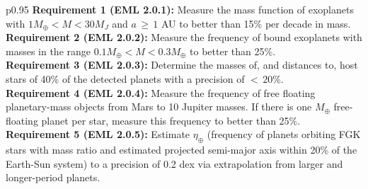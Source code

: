 \documentclass[twocolumn]{aastex631}
\begin{document}
\begin{deluxetable*}{p{0.95\linewidth}}
\tablehead{}
\startdata
\textbf{Requirement 1 (EML 2.0.1):} Measure the mass function of exoplanets with $1M_{\oplus} < M < 30 M_J$ and $a\, {\geq}\, 1$ AU to better than 15\% per decade in mass. \\[4pt]
\textbf{Requirement 2 (EML 2.0.2):} Measure the frequency of bound exoplanets with masses in the range $0.1 M_{\oplus} < M < 0.3 M_{\oplus}$ to better than 25\%. \\[4pt]
\textbf{Requirement 3 (EML 2.0.3):} Determine the masses of, and distances to, host stars of 40\% of the detected planets with a precision of $<\,20$\%. \\[4pt]
\textbf{Requirement 4 (EML 2.0.4):} Measure the frequency of free floating planetary-mass objects from Mars to 10 Jupiter masses. If there is one $M_{\oplus}$ free-floating planet per star, measure this frequency to better than 25\%. \\[4pt]
\textbf{Requirement 5 (EML 2.0.5):} Estimate $\eta_{\oplus}$ (frequency of planets orbiting FGK stars with mass ratio and estimated projected semi-major axis within 20\% of the Earth-Sun system) to a precision of 0.2 dex via extrapolation from larger and longer-period planets. \\
\enddata
\end{deluxetable*}
\end{document}
